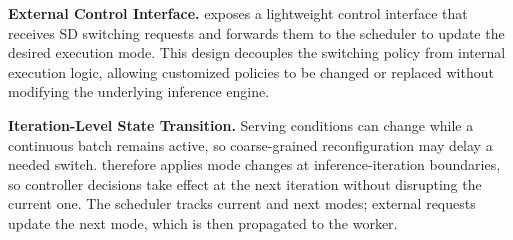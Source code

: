 \textbf{External Control Interface.}
\sysname exposes a lightweight control interface that receives SD switching requests and forwards them to the scheduler to update the desired execution mode.
This design decouples the switching policy from internal execution logic, allowing customized policies to be changed or replaced without modifying the underlying inference engine.

\textbf{Iteration-Level State Transition.}
Serving conditions can change while a continuous batch remains active, so coarse-grained reconfiguration may delay a needed switch. \sysname therefore applies mode changes at inference-iteration boundaries, so controller decisions take effect at the next iteration without disrupting the current one. The scheduler tracks current and next modes; external requests update the next mode, which is then propagated to the worker.

